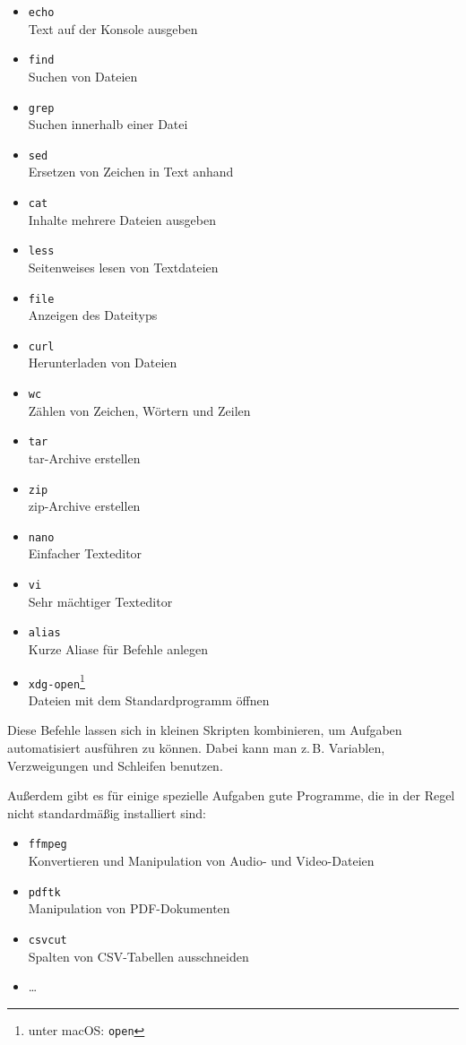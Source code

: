 \documentclass[a4paper,12pt]{article}
\begin{document}
\begin{itemize}
    \item \texttt{echo}\\Text auf der Konsole ausgeben
    \item \texttt{find}\\Suchen von Dateien
    \item \texttt{grep}\\Suchen innerhalb einer Datei
    \item \texttt{sed}\\Ersetzen von Zeichen in Text anhand 
    \item \texttt{cat}\\Inhalte mehrere Dateien ausgeben
    \item \texttt{less}\\Seitenweises lesen von Textdateien
    \item \texttt{file}\\Anzeigen des Dateityps
    \item \texttt{curl}\\Herunterladen von Dateien
    \item \texttt{wc}\\Zählen von Zeichen, Wörtern und Zeilen
    \item \texttt{tar}\\tar-Archive erstellen
    \item \texttt{zip}\\zip-Archive erstellen
    \item \texttt{nano}\\Einfacher Texteditor
    \item \texttt{vi}\\Sehr mächtiger Texteditor
    \item \texttt{alias}\\Kurze Aliase für Befehle anlegen
    \item \texttt{xdg-open}\footnote{unter macOS: \texttt{open}}\\Dateien mit dem Standardprogramm öffnen
\end{itemize}

Diese Befehle lassen sich in kleinen Skripten kombinieren, um Aufgaben automatisiert ausführen zu können. Dabei kann man z.\,B. Variablen, Verzweigungen und Schleifen benutzen.

Außerdem gibt es für einige spezielle Aufgaben gute Programme, die in der Regel nicht standardmäßig installiert sind:

\begin{itemize}
    \item \texttt{ffmpeg}\\Konvertieren und Manipulation von Audio- und Video-Dateien 
    \item \texttt{pdftk}\\Manipulation von PDF-Dokumenten
    \item \texttt{csvcut}\\Spalten von CSV-Tabellen ausschneiden
    \item \dots
\end{itemize}
\end{document}
